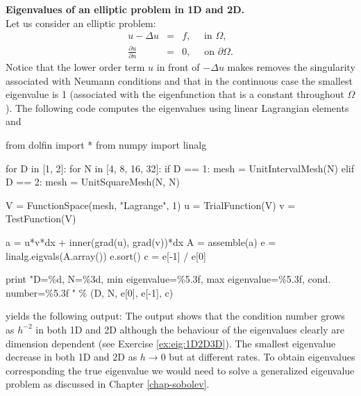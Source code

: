 \begin{example}{\textbf{Eigenvalues of an elliptic problem in 1D and 2D.}} \\
Let us consider an elliptic problem: 
\begin{eqnarray}
u - \Delta u &=& f, \quad \text{ in } \Omega, \\     
\frac{\partial u}{\partial n} &=& 0, \quad \text{ on } \partial \Omega .  
\end{eqnarray}
Notice that the lower order term $u$ in front of $-\Delta u$ makes removes
the singularity associated with Neumann conditions and that in the continuous
case the smallest eigenvalue is 1 (associated with the eigenfunction that is a constant throughout $\Omega$). 
The following code computes the eigenvalues using 
linear Lagrangian elements and  
\begin{python}
from dolfin import *
from numpy import linalg 

for D in [1, 2]: 
  for N in [4, 8, 16, 32]:
    if   D == 1:  mesh = UnitIntervalMesh(N)
    elif D == 2:  mesh = UnitSquareMesh(N, N)

    V = FunctionSpace(mesh, "Lagrange", 1)
    u = TrialFunction(V)
    v = TestFunction(V)

    a = u*v*dx  + inner(grad(u), grad(v))*dx  
    A = assemble(a) 
    e = linalg.eigvals(A.array()) 
    e.sort()
    c = e[-1] / e[0]

    print "D=\%d, N=\%3d, min eigenvalue=\%5.3f, max eigenvalue=\%5.3f, cond. number=\%5.3f " \% (D, N, e[0], e[-1], c) 
\end{python}
yields the following output:  
The output shows that the condition number grows as $h^{-2}$ in both 1D and 2D although
the behaviour of the eigenvalues clearly are dimension dependent (see Exercise \ref{ex:eig:1D2D3D}). The smallest eigenvalue decrease in both 1D and 2D as $h\rightarrow 0$ but at different rates. To obtain eigenvalues corresponding the
true eigenvalue we would need to solve a generalized eigenvalue problem 
as discussed in Chapter \ref{chap-sobolev}.           
\end{example}


